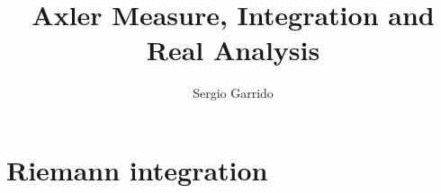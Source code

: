 \documentclass{bookSolutions}
\title{Axler Measure, Integration and Real Analysis}
\author{Sergio Garrido}
\begin{document}
\maketitle

\tableofcontents

\newpage

\section{Riemann integration}



% 
% 
% 

% 
% 
% 
% 

% 
% 
% 

% 
% 
% 

% 

% 
% 
% 
% 

% 
% 
% 
\end{document}
